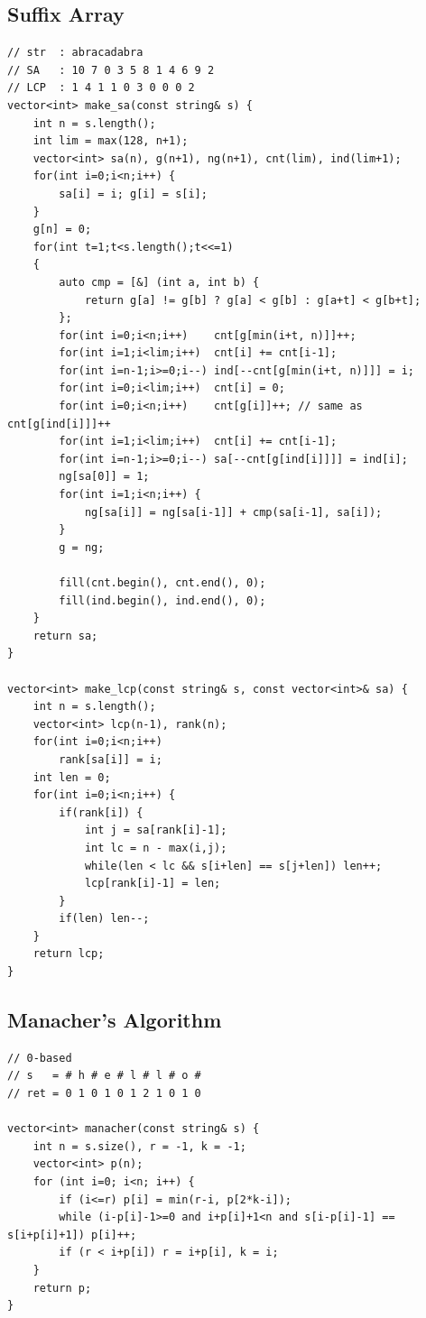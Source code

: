 \documentclass[landscape, 8pt, a4paper, oneside, twocolumn]{extarticle}
\begin{document}
\subsection{Suffix Array}
\begin{verbatim}
// str  : abracadabra
// SA   : 10 7 0 3 5 8 1 4 6 9 2
// LCP  : 1 4 1 1 0 3 0 0 0 2
vector<int> make_sa(const string& s) {
    int n = s.length();
    int lim = max(128, n+1);
    vector<int> sa(n), g(n+1), ng(n+1), cnt(lim), ind(lim+1);
    for(int i=0;i<n;i++) {
        sa[i] = i; g[i] = s[i];
    }
    g[n] = 0;
    for(int t=1;t<s.length();t<<=1)
    {
        auto cmp = [&] (int a, int b) {
            return g[a] != g[b] ? g[a] < g[b] : g[a+t] < g[b+t];
        };
        for(int i=0;i<n;i++)    cnt[g[min(i+t, n)]]++;
        for(int i=1;i<lim;i++)  cnt[i] += cnt[i-1];
        for(int i=n-1;i>=0;i--) ind[--cnt[g[min(i+t, n)]]] = i;
        for(int i=0;i<lim;i++)  cnt[i] = 0;
        for(int i=0;i<n;i++)    cnt[g[i]]++; // same as cnt[g[ind[i]]]++
        for(int i=1;i<lim;i++)  cnt[i] += cnt[i-1];
        for(int i=n-1;i>=0;i--) sa[--cnt[g[ind[i]]]] = ind[i];
        ng[sa[0]] = 1;
        for(int i=1;i<n;i++) {
            ng[sa[i]] = ng[sa[i-1]] + cmp(sa[i-1], sa[i]);
        }
        g = ng;
        
        fill(cnt.begin(), cnt.end(), 0);
        fill(ind.begin(), ind.end(), 0);
    }
    return sa;
}

vector<int> make_lcp(const string& s, const vector<int>& sa) {
    int n = s.length();
    vector<int> lcp(n-1), rank(n);
    for(int i=0;i<n;i++)
        rank[sa[i]] = i;
    int len = 0;
    for(int i=0;i<n;i++) {
        if(rank[i]) {
            int j = sa[rank[i]-1];
            int lc = n - max(i,j);
            while(len < lc && s[i+len] == s[j+len]) len++;
            lcp[rank[i]-1] = len;
        }
        if(len) len--;
    }
    return lcp;
}
\end{verbatim}
\subsection{Manacher's Algorithm}
\begin{verbatim}
// 0-based
// s   = # h # e # l # l # o #
// ret = 0 1 0 1 0 1 2 1 0 1 0

vector<int> manacher(const string& s) {
    int n = s.size(), r = -1, k = -1;
    vector<int> p(n);
    for (int i=0; i<n; i++) {
        if (i<=r) p[i] = min(r-i, p[2*k-i]);
        while (i-p[i]-1>=0 and i+p[i]+1<n and s[i-p[i]-1] == s[i+p[i]+1]) p[i]++;
        if (r < i+p[i]) r = i+p[i], k = i;
    }
    return p;
}
\end{verbatim}
\end{document}

